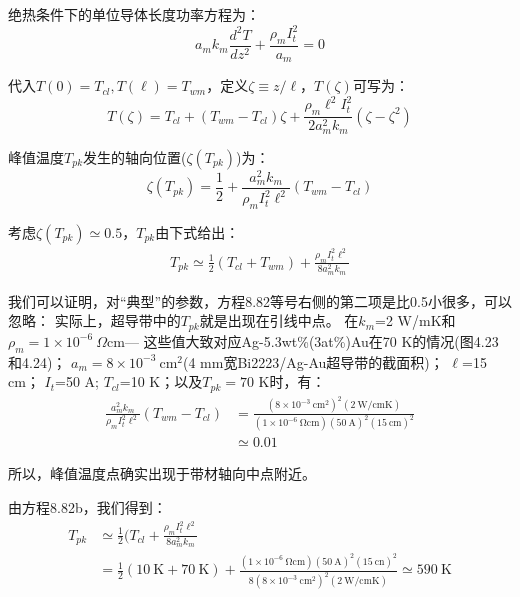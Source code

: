 绝热条件下的单位导体长度功率方程为：
\begin{equation}%
a_mk_m\frac{d^2T}{dz^2}+\frac{\rho_mI_{t}^{2}}{a_m}=0
\end{equation}

代入$T(0)=T_{cl},T(\ell)=T_{wm}$，定义$\zeta\equiv z/\ell$，$T(\zeta)$可写为：
\begin{equation}%
T(\zeta)=T_{cl}+(T_{wm}-T_{cl})\zeta+\frac{\rho_m\ell^2I_{t}^{2}}{2a_{m}^{2}k_m}(\zeta-\zeta^2)
\end{equation}

峰值温度$T_{pk}$发生的轴向位置($\zeta(T_{pk})$)为：
\begin{equation}%
\zeta(T_{pk})=\frac{1}{2}+\frac{a_{m}^{2}k_m}{\rho_mI_{t}^{2}\ell^2}(T_{wm}-T_{cl})
\end{equation}

考虑$\zeta(T_{pk})\simeq 0.5$，$T_{pk}$由下式给出：
\begin{align*}%
T_{pk}\simeq \frac{1}{2}(T_{cl}+T_{wm})+\frac{\rho_mI_{t}^{2}\ell^2}{8a_{m}^{2}k_m} \tag{8.82b}
\end{align*}

我们可以证明，对“典型”的参数，方程8.82等号右侧的第二项是比0.5小很多，可以忽略：
实际上，超导带中的$T_{pk}$就是出现在引线中点。
在$k_m$=2 W/mK和$\rho_m=1\times 10^{-6}\ \Omega$cm---
这些值大致对应Ag-5.3wt\%(3at\%)Au在70 K的情况(图4.23和4.24)；
$a_m=8\times 10^{-3}\ \mathrm{cm^2}$(4 mm宽Bi2223/Ag-Au超导带的截面积)；
$\ell$=15 cm；
$I_t$=50 A;
$T_{cl}$=10 K；以及$T_{pk}=70$ K时，有：
\begin{align*}%
\frac{a_{m}^{2}k_m}{\rho_mI_{t}^{2}\ell^2}(T_{wm}-T_{cl})&=\frac{(8\times 10^{-3}\ \mathrm{cm^2})^2(2\ \mathrm{W/cm K})}{(1\times 10^{-6}\ \mathrm{\Omega cm})(50\ \mathrm{A})^2(15\ \mathrm{cm})^2} \\
&\simeq 0.01
\end{align*}

所以，峰值温度点确实出现于带材轴向中点附近。

由方程8.82b，我们得到：
\begin{align*}%
T_{pk}&\simeq\frac{1}{2}(T_{cl}+\frac{\rho_mI_{t}^{2}\ell^2}{8a_{m}^{2}k_m} \\
&=\frac{1}{2}(10\ \mathrm{K}+70\ \mathrm{K})+\frac{(1\times 10^{-6}\ \mathrm{\Omega cm})(50\ \mathrm{A})^2(15\ \mathrm{cn})^2}{8(8\times 10^{-3}\ \mathrm{cm^2})^2(2\ \mathrm{W/cm K})}\simeq 590\ \mathrm{K}
\end{align*}


